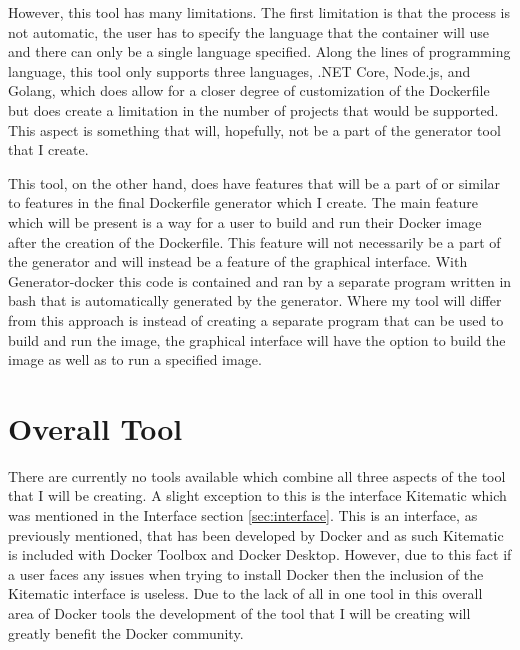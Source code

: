 However, this tool has many limitations. The first limitation is that the process is not automatic, the user has to specify the language that the container will use and there can only be a single language specified. Along the lines of programming language, this tool only supports three languages, .NET Core, Node.js, and Golang, which does allow for a closer degree of customization of the Dockerfile but does create a limitation in the number of projects that would be supported. This aspect is something that will, hopefully, not be a part of the generator tool that I create.

This tool, on the other hand, does have features that will be a part of or similar to features in the final Dockerfile generator which I create. The main feature which will be present is a way for a user to build and run their Docker image after the creation of the Dockerfile. This feature will not necessarily be a part of the generator and will instead be a feature of the graphical interface. With Generator-docker this code is contained and ran by a separate program written in bash that is automatically generated by the generator. Where my tool will differ from this approach is instead of creating a separate program that can be used to build and run the image, the graphical interface will have the option to build the image as well as to run a specified image.

\section{Overall Tool}
\label{sec:overall}

There are currently no tools available which combine all three aspects of the tool that I will be creating. A slight exception to this is the interface Kitematic which was mentioned in the Interface section \ref{sec:interface}. This is an interface, as previously mentioned, that has been developed by Docker and as such Kitematic is included with Docker Toolbox and Docker Desktop. However, due to this fact if a user faces any issues when trying to install Docker then the inclusion of the Kitematic interface is useless. Due to the lack of all in one tool in this overall area of Docker tools the development of the tool that I will be creating will greatly benefit the Docker community.
